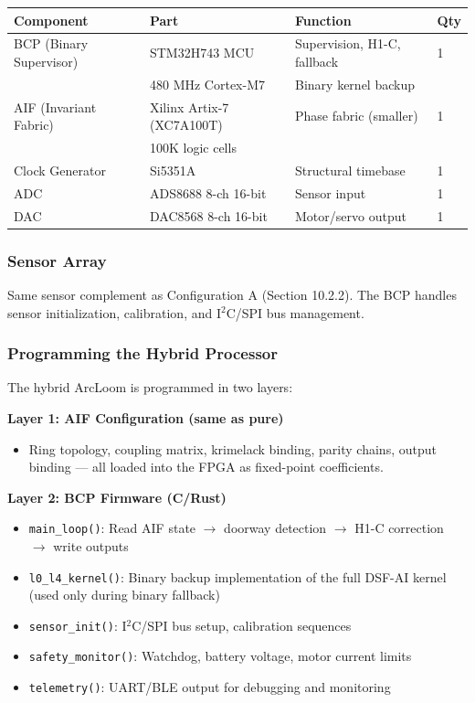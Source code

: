\documentclass[11pt, a4paper]{article}
\begin{document}
\begin{center}
\begin{tabular}{@{}llll@{}}
\toprule
\textbf{Component} & \textbf{Part} & \textbf{Function} & \textbf{Qty} \\
\midrule
BCP (Binary Supervisor) & STM32H743 MCU & Supervision, H1-C, fallback & 1 \\
                        & 480 MHz Cortex-M7 & Binary kernel backup & \\
AIF (Invariant Fabric) & Xilinx Artix-7 (XC7A100T) & Phase fabric (smaller) & 1 \\
                       & 100K logic cells & \\
Clock Generator & Si5351A & Structural timebase & 1 \\
ADC & ADS8688 8-ch 16-bit & Sensor input & 1 \\
DAC & DAC8568 8-ch 16-bit & Motor/servo output & 1 \\
\bottomrule
\end{tabular}
\end{center}

\subsubsection{Sensor Array}

Same sensor complement as Configuration A (Section 10.2.2). The BCP
handles sensor initialization, calibration, and I$^2$C/SPI bus management.

\subsubsection{Programming the Hybrid Processor}

The hybrid ArcLoom is programmed in two layers:

\textbf{Layer 1: AIF Configuration (same as pure)}
\begin{itemize}[nosep]
  \item Ring topology, coupling matrix, krimelack binding, parity chains,
        output binding --- all loaded into the FPGA as fixed-point coefficients.
\end{itemize}

\textbf{Layer 2: BCP Firmware (C/Rust)}
\begin{itemize}[nosep]
  \item \texttt{main\_loop()}: Read AIF state $\to$ doorway detection $\to$
        H1-C correction $\to$ write outputs
  \item \texttt{l0\_l4\_kernel()}: Binary backup implementation of the full
        DSF-AI kernel (used only during binary fallback)
  \item \texttt{sensor\_init()}: I$^2$C/SPI bus setup, calibration sequences
  \item \texttt{safety\_monitor()}: Watchdog, battery voltage, motor current limits
  \item \texttt{telemetry()}: UART/BLE output for debugging and monitoring
\end{itemize}
\end{document}
